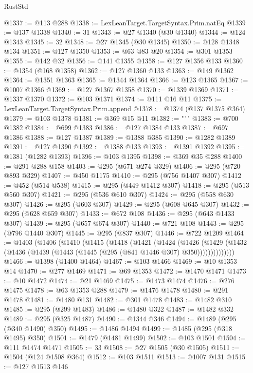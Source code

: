 \begin{lexlean}{RustStd}
\begin{coremodule}
@1337 := @113 @288
@1338 := LexLeanTarget.TargetSyntax.Prim.natEq
@1339 := @137 @1338
@1340 := 31
@1343 := @27 @1340 (@30 @1340)
@1344 := @124 @1343
@1345 := 32
@1348 := @27 @1345 (@30 @1345)
@1350 := @128 @1348 @134
@1351 := @127 @1350
@1353 := @63 @83 @20
@1354 := @301 @1353
@1355 := @142 @32
@1356 := @141 @1355
@1358 := @127 @1356 @133
@1360 := @1354 (@168 @1358)
@1362 := @127 @1360 @133
@1363 := @149 @1362
@1364 := @1351 @1363
@1365 := @1344 @1364
@1366 := @123 @1365
@1367 := @1007 @1366
@1369 := @127 @1367 @1358
@1370 := @1339 @1369
@1371 := @1337 @1370
@1372 := @103 @1371
@1374 := @111 @16 @11
@1375 := LexLeanTarget.TargetSyntax.Prim.append
@1378 := @1374 (@137 @1375 @364)
@1379 := @103 @1378
@1381 := @369 @15 @11
@1382 := "`"
@1383 := @700 @1382
@1384 := @699 @1383
@1386 := @127 @1384 @133
@1387 := @697 @1386
@1388 := @127 @1387
@1389 := @1388 @385
@1390 := @1282 @1389
@1391 := @127 @1390
@1392 := @1388 @133
@1393 := @1391 @1392
@1395 := @1381 (@1282 @1393)
@1396 := @103 @1395
@1398 := @369 @35 @288
@1400 := @291 @288 @158
@1403 := @295 (@671 @274 @329)
@1406 := @295 (@720 @893 @329)
@1407 := @450 @1175
@1410 := @295 (@756 @1407 @307)
@1412 := @452 (@514 @538)
@1415 := @295 (@449 @1412 @307)
@1418 := @295 (@513 @560 @307)
@1421 := @295 (@536 @610 @307)
@1424 := @295 (@558 @630 @307)
@1426 := @295 (@603 @307)
@1429 := @295 (@608 @645 @307)
@1432 := @295 (@628 @659 @307)
@1433 := @672 @108
@1436 := @295 (@643 @1433 @307)
@1439 := @295 (@657 @674 @307)
@1440 := @721 @108
@1443 := @295 (@796 @1440 @307)
@1445 := @295 (@837 @307)
@1446 := @722 @1209
@1464 := @1403
    (@1406
      (@1410
        (@1415
          (@1418
            (@1421
              (@1424
                (@1426
                  (@1429
                    (@1432 (@1436 (@1439 (@1443 (@1445 (@295 (@841 @1446 @307) @350))))))))))))))
@1466 := @1398 (@1400 @1464)
@1467 := @103 @1466
@1469 := @10 @1353 @14
@1470 := @277 @1469
@1471 := @69 @1353
@1472 := @1470 @1471
@1473 := @10 @1472
@1474 := @21 @1469
@1475 := @1473 @1474
@1476 := @276 @1475
@1478 := @63 @1353 @288
@1479 := @1476 @1478
@1480 := @291 @1478
@1481 := @1480 @131
@1482 := @301 @1478
@1483 := @1482 @310
@1485 := @295 (@299 @1483)
@1486 := @1480 @322
@1487 := @1482 @332
@1489 := @295 (@325 @1487)
@1490 := @1344 @346
@1494 := @1489 (@295 (@340 @1490) @350)
@1495 := @1486 @1494
@1499 := @1485 (@295 (@318 @1495) @350)
@1501 := @1479 (@1481 @1499)
@1502 := @103 @1501
@1504 := @111 @1474 @1471
@1505 := 33
@1508 := @27 @1505 (@30 @1505)
@1511 := @1504 (@124 @1508 @364)
@1512 := @103 @1511
@1513 := @1007 @131
@1515 := @127 @1513 @146

\end{coremodule}
\end{lexlean}
